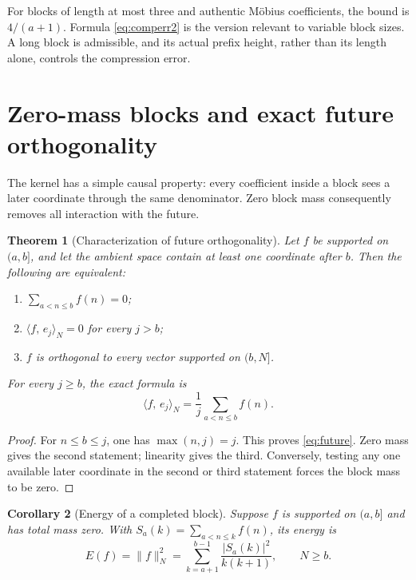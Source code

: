\documentclass[11pt]{article}
\newtheorem{theorem}{Theorem}[section]
\newtheorem{corollary}[theorem]{Corollary}
\theoremstyle{definition}
\theoremstyle{remark}
\newcommand{\ip}[2]{\langle #1,\, #2\rangle}
\begin{document}
For blocks of length at most three and authentic M\"obius coefficients, the bound is $4/(a+1)$. Formula \eqref{eq:comperr2} is the version relevant to variable block sizes. A long block is admissible, and its actual prefix height, rather than its length alone, controls the compression error.

\section{Zero-mass blocks and exact future orthogonality}\label{sec:zeromass}

The kernel has a simple causal property: every coefficient inside a block sees a later coordinate through the same denominator. Zero block mass consequently removes all interaction with the future.

\begin{theorem}[Characterization of future orthogonality]\label{thm:future}
Let $f$ be supported on $(a,b]$, and let the ambient space contain at least one coordinate after $b$. Then the following are equivalent:
\begin{enumerate}[label=(\arabic*)]
\item $\sum_{a<n\le b}f(n)=0$;
\item $\ip{f}{e_j}_N=0$ for every $j>b$;
\item $f$ is orthogonal to every vector supported on $(b,N]$.
\end{enumerate}
For every $j\ge b$, the exact formula is
\begin{equation}\label{eq:future}
\ip{f}{e_j}_N=\frac1j\sum_{a<n\le b}f(n).
\end{equation}
\end{theorem}

\begin{proof}
For $n\le b\le j$, one has $\max(n,j)=j$. This proves \eqref{eq:future}. Zero mass gives the second statement; linearity gives the third. Conversely, testing any one available later coordinate in the second or third statement forces the block mass to be zero.
\end{proof}

\begin{corollary}[Energy of a completed block]\label{cor:blockenergy}
Suppose $f$ is supported on $(a,b]$ and has total mass zero. With $S_a(k)=\sum_{a<n\le k}f(n)$, its energy is
\begin{equation}\label{eq:EB}
E(f)=\|f\|_N^2=\sum_{k=a+1}^{b-1}\frac{|S_a(k)|^2}{k(k+1)},\qquad N\ge b.
\end{equation}
\end{corollary}
\end{document}
